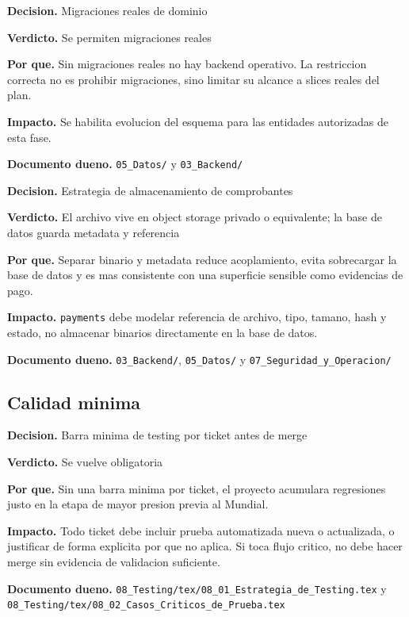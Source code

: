 \begin{docnote}
\textbf{Decision.} Migraciones reales de dominio

\textbf{Verdicto.} Se permiten migraciones reales

\textbf{Por que.} Sin migraciones reales no hay backend operativo. La restriccion correcta no es prohibir migraciones, sino limitar su alcance a slices reales del plan.

\textbf{Impacto.} Se habilita evolucion del esquema para las entidades autorizadas de esta fase.

\textbf{Documento dueno.} \texttt{05\_Datos/} y \texttt{03\_Backend/}
\end{docnote}

\begin{docnote}
\textbf{Decision.} Estrategia de almacenamiento de comprobantes

\textbf{Verdicto.} El archivo vive en object storage privado o equivalente; la base de datos guarda metadata y referencia

\textbf{Por que.} Separar binario y metadata reduce acoplamiento, evita sobrecargar la base de datos y es mas consistente con una superficie sensible como evidencias de pago.

\textbf{Impacto.} \texttt{payments} debe modelar referencia de archivo, tipo, tamano, hash y estado, no almacenar binarios directamente en la base de datos.

\textbf{Documento dueno.} \texttt{03\_Backend/}, \texttt{05\_Datos/} y \texttt{07\_Seguridad\_y\_Operacion/}
\end{docnote}

\subsection{Calidad minima}

\begin{docnote}
\textbf{Decision.} Barra minima de testing por ticket antes de merge

\textbf{Verdicto.} Se vuelve obligatoria

\textbf{Por que.} Sin una barra minima por ticket, el proyecto acumulara regresiones justo en la etapa de mayor presion previa al Mundial.

\textbf{Impacto.} Todo ticket debe incluir prueba automatizada nueva o actualizada, o justificar de forma explicita por que no aplica. Si toca flujo critico, no debe hacer merge sin evidencia de validacion suficiente.

\textbf{Documento dueno.} \texttt{08\_Testing/tex/08\_01\_Estrategia\_de\_Testing.tex} y \texttt{08\_Testing/tex/08\_02\_Casos\_Criticos\_de\_Prueba.tex}
\end{docnote}

